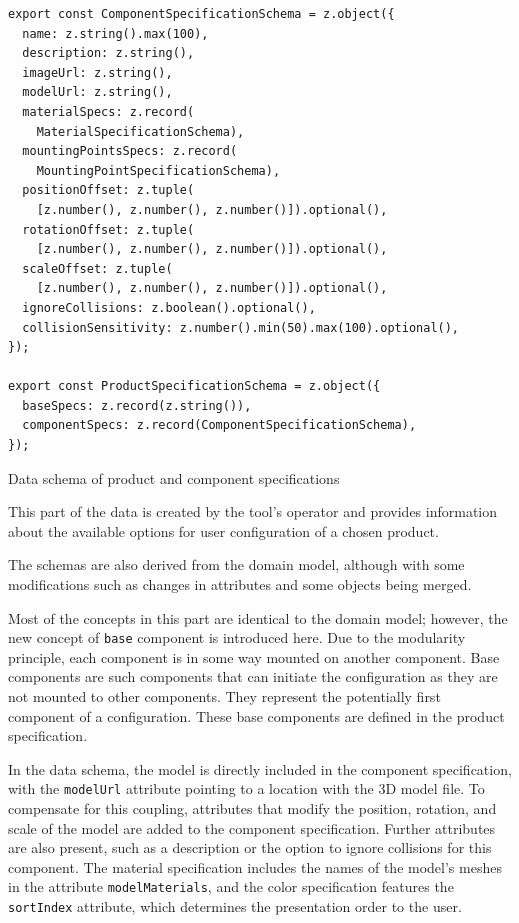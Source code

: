 \begin{listing}[h]
\begin{verbatim}
export const ComponentSpecificationSchema = z.object({
  name: z.string().max(100),
  description: z.string(),
  imageUrl: z.string(),
  modelUrl: z.string(),
  materialSpecs: z.record(
    MaterialSpecificationSchema),
  mountingPointsSpecs: z.record(
    MountingPointSpecificationSchema),
  positionOffset: z.tuple(
    [z.number(), z.number(), z.number()]).optional(),
  rotationOffset: z.tuple(
    [z.number(), z.number(), z.number()]).optional(),
  scaleOffset: z.tuple(
    [z.number(), z.number(), z.number()]).optional(),
  ignoreCollisions: z.boolean().optional(),
  collisionSensitivity: z.number().min(50).max(100).optional(),
});

export const ProductSpecificationSchema = z.object({
  baseSpecs: z.record(z.string()),
  componentSpecs: z.record(ComponentSpecificationSchema),
});
\end{verbatim}
\caption{Data schema of product and component specifications}
\label{lisiting:schema-componentspecification}
\end{listing}

This part of the data is created by the tool's operator and provides information about the available options for user configuration of a chosen product.

The schemas are also derived from the domain model, although with some modifications such as changes in attributes and some objects being merged.

Most of the concepts in this part are identical to the domain model; however, the new concept of \texttt{base} component is introduced here. Due to the modularity principle, each component is in some way mounted on another component. Base components are such components that can initiate the configuration as they are not mounted to other components. They represent the potentially first component of a configuration. These base components are defined in the product specification.

In the data schema, the model is directly included in the component specification, with the \texttt{modelUrl} attribute pointing to a location with the 3D model file. To compensate for this coupling, attributes that modify the position, rotation, and scale of the model are added to the component specification. Further attributes are also present, such as a description or the option to ignore collisions for this component. The material specification includes the names of the model's meshes in the attribute \texttt{modelMaterials}, and the color specification features the \texttt{sortIndex} attribute, which determines the presentation order to the user.

